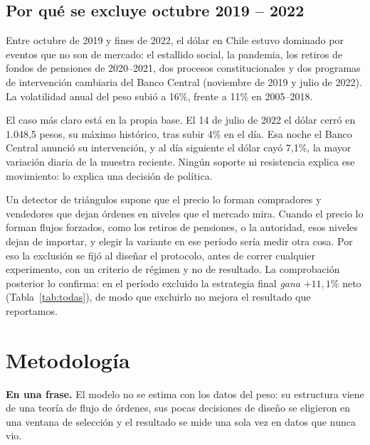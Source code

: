 \documentclass[10pt,a4paper]{article}
\begin{document}
\subsection{Por qué se excluye octubre 2019 -- 2022}\label{sec:exclusion}

Entre octubre de 2019 y fines de 2022, el dólar en Chile estuvo dominado por eventos
que no son de mercado: el estallido social, la pandemia, los retiros de fondos de
pensiones de 2020--2021, dos procesos constitucionales y dos programas de intervención
cambiaria del Banco Central (noviembre de 2019 y julio de 2022). La volatilidad anual
del peso subió a 16\%, frente a 11\% en 2005--2018.

El caso más claro está en la propia base. El 14 de julio de 2022 el dólar cerró en
1.048,5 pesos, su máximo histórico, tras subir 4\% en el día. Esa noche el Banco
Central anunció su intervención, y al día siguiente el dólar cayó 7,1\%, la mayor
variación diaria de la muestra reciente. Ningún soporte ni resistencia explica ese
movimiento: lo explica una decisión de política.

Un detector de triángulos supone que el precio lo forman compradores y vendedores que
dejan órdenes en niveles que el mercado mira. Cuando el precio lo forman flujos
forzados, como los retiros de pensiones, o la autoridad, esos niveles dejan de
importar, y elegir la variante en ese período sería medir otra cosa. Por eso la
exclusión se fijó al diseñar el protocolo, antes de correr cualquier experimento, con
un criterio de régimen y no de resultado. La comprobación posterior lo confirma: en el
período excluido la estrategia final \emph{gana} $+11{,}1\%$ neto
(Tabla~\ref{tab:todas}), de modo que excluirlo no mejora el resultado que reportamos.

\section{Metodología}\label{sec:metodo}

\begin{ideaclave}
\textbf{En una frase.} El modelo no se estima con los datos del peso: su estructura viene
de una teoría de flujo de órdenes, sus pocas decisiones de diseño se eligieron en una
ventana de selección y el resultado se mide una sola vez en datos que nunca vio.
\end{ideaclave}
\end{document}
